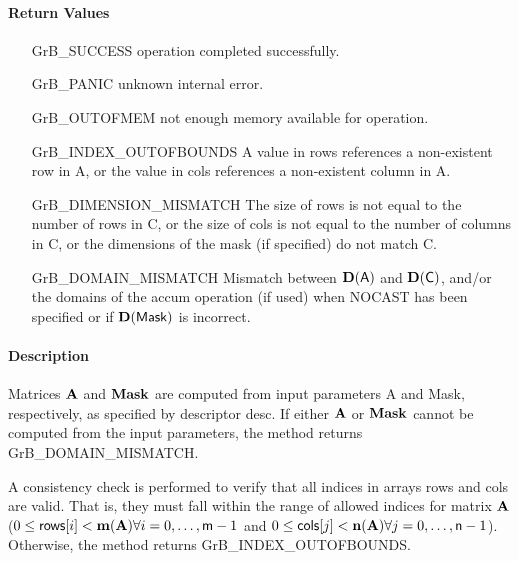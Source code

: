 \paragraph{Return Values}

\begin{itemize}[leftmargin=2.1in]
\item[{\sf GrB\_SUCCESS}]     operation completed successfully.
\item[{\sf GrB\_PANIC}]        unknown internal error.
\item[{\sf GrB\_OUTOFMEM}]    not enough memory available for operation.
\item[{\sf GrB\_INDEX\_OUTOFBOUNDS}]
        A value in {\sf rows} references a non-existent row in {\sf A}, or
        the value in {\sf cols} references a non-existent column in {\sf A}.
\item[{\sf GrB\_DIMENSION\_MISMATCH}] 
        The size of {\sf rows} is not equal to the number of rows in {\sf C}, or
        the size of {\sf cols} is not equal to the number of columns in {\sf C}, or
        the dimensions of the mask (if specified) do not match {\sf C}.
\item[{\sf GrB\_DOMAIN\_MISMATCH}]    Mismatch between $\bold{D}({\sf A})$ and $\bold{D}({\sf C})$, and/or the domains of the 
                                      {\sf accum} operation (if used) when {\sf NOCAST} has
                                      been specified or if $\bold{D}(\sf Mask)$ is incorrect.
\end{itemize}


\paragraph{Description}

Matrices ${\bf A}$ and ${\bf Mask}$ are computed from input
parameters {\sf A} and {\sf Mask}, respectively, as specified by
descriptor {\sf desc}.  If either ${\bf A}$ or ${\bf Mask}$
cannot be computed from the input parameters, the method returns {\sf
GrB\_DOMAIN\_MISMATCH}.

A consistency check is performed to verify that all indices in arrays
{\sf rows} and {\sf cols} are valid. That is, they must fall within the range of allowed
indices for matrix ${\bf A}$ ($0 \leq {\sf rows}[i] < \bold{m}({\bf A})
\forall i = 0,\ldots,{\sf m}-1$ and
$0 \leq {\sf cols}[j] < \bold{n}({\bf A}) \forall j = 0,\ldots,{\sf n}-1$).  Otherwise, the method returns {\sf
GrB\_INDEX\_OUTOFBOUNDS}.

